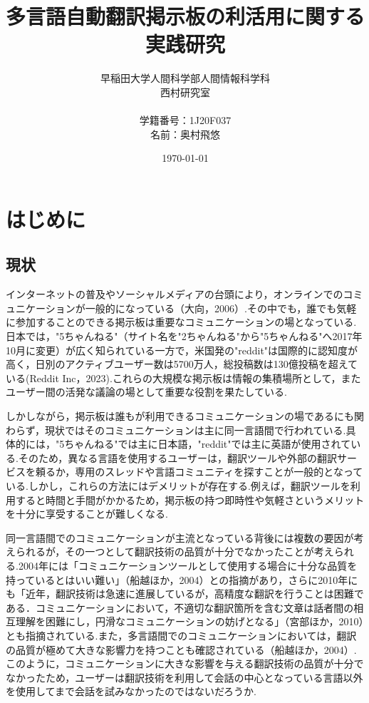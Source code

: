 \documentclass[b5paper,12pt,dvipdfmx]{jsreport}
\title{多言語自動翻訳掲示板の利活用に関する実践研究}
\author{早稲田大学人間科学部人間情報科学科\\西村研究室\\ \\学籍番号：1J20F037\\名前：奥村飛悠}
\date{\today}
\begin{document}
\maketitle

\tableofcontents

\clearpage %
\chapter{はじめに}
 
\section{現状}

インターネットの普及やソーシャルメディアの台頭により，オンラインでのコミュニケーションが一般的になっている（大向，2006）.その中でも，誰でも気軽に参加することのできる掲示板は重要なコミュニケーションの場となっている.日本では，"5ちゃんねる"（サイト名を"2ちゃんねる"から"5ちゃんねる"へ2017年10月に変更）が広く知られている一方で，米国発の"reddit"は国際的に認知度が高く，日別のアクティブユーザー数は5700万人，総投稿数は130億投稿を超えている(Reddit Inc，2023).これらの大規模な掲示板は情報の集積場所として，またユーザー間の活発な議論の場として重要な役割を果たしている.

しかしながら，掲示板は誰もが利用できるコミュニケーションの場であるにも関わらず，現状ではそのコミュニケーションは主に同一言語間で行われている.具体的には，"5ちゃんねる"では主に日本語，"reddit"では主に英語が使用されている.そのため，異なる言語を使用するユーザーは，翻訳ツールや外部の翻訳サービスを頼るか，専用のスレッドや言語コミュニティを探すことが一般的となっている.しかし，これらの方法にはデメリットが存在する.例えば，翻訳ツールを利用すると時間と手間がかかるため，掲示板の持つ即時性や気軽さというメリットを十分に享受することが難しくなる.

同一言語間でのコミュニケーションが主流となっている背後には複数の要因が考えられるが，その一つとして翻訳技術の品質が十分でなかったことが考えられる.2004年には「コミュニケーションツールとして使用する場合に十分な品質を持っているとはいい難い」（船越ほか，2004）との指摘があり，さらに2010年にも「近年，翻訳技術は急速に進展しているが，高精度な翻訳を行うことは困難である．コミュニケーションにおいて，不適切な翻訳箇所を含む文章は話者間の相互理解を困難にし，円滑なコミュニケーションの妨げとなる」（宮部ほか，2010）とも指摘されている.また，多言語間でのコミュニケーションにおいては，翻訳の品質が極めて大きな影響力を持つことも確認されている（船越ほか，2004）.このように，コミュニケーションに大きな影響を与える翻訳技術の品質が十分でなかったため，ユーザーは翻訳技術を利用して会話の中心となっている言語以外を使用してまで会話を試みなかったのではないだろうか.
\end{document}
